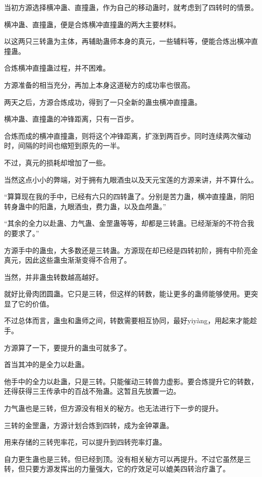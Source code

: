 
\begin{this_body}

当初方源选择横冲蛊、直撞蛊，作为自己的移动蛊时，就考虑到了四转时的情景。

横冲蛊、直撞蛊，便是合炼横冲直撞蛊的两大主要材料。

以这两只三转蛊为主体，再辅助蛊师本身的真元，一些辅料等，便能合炼出横冲直撞蛊。

合炼横冲直撞蛊过程，并不困难。

方源准备的相当充分，再加上本身这道秘方的成功率也很高。

两天之后，方源合炼成功，得到了一只全新的蛊虫横冲直撞蛊。

横冲蛊、直撞蛊的冲锋距离，只有一百步。

合炼而成的横冲直撞蛊，则将这个冲锋距离，扩涨到两百步。同时连续两次催动时，间隔的时间也缩短到原先的一半。

不过，真元的损耗却增加了一些。

当然这点小小的弊端，对于拥有九眼酒虫以及天元宝莲的方源来讲，并不算什么。

“算算现在我的手中，已经有六只的四转蛊了。分别是苦力蛊，横冲直撞蛊，阴阳转身蛊中的阳蛊，九眼酒虫，费力蛊，以及血颅蛊。”

“其余的全力以赴蛊、力气蛊、金罡蛊等等，却都是三转蛊。已经渐渐的不符合我的要求了。”

方源手中的蛊虫，大多数还是三转蛊。方源现在却已经是四转初阶，拥有中阶亮金真元，因此这些蛊虫渐渐变得不合用了。

当然，并非蛊虫转数越高越好。

就好比骨肉团圆蛊。它只是三转，但这样的转数，能让更多的蛊师能够使用。更突显了它的价值。

不过总体而言，蛊虫和蛊师之间，转数需要相互协同，最好yiyàng，用起来才能趁手。

方源算了一下，要提升的蛊虫可就多了。

首当其冲的是全力以赴蛊。

他手中的全力以赴蛊，只是三转。只能催动三转兽力虚影。要合炼提升它的转数，还得获得三王传承中的百战不殆蛊。这暂且先放置一边。

力气蛊也是三转，但方源没有相关的秘方。也无法进行下一步的提升。

三转的金罡蛊，方源计划合炼到四转，成为金钟罩蛊。

用来存储的三转兜率花，可以提升到四转兜率灯蛊。

自力更生蛊也是三转。但已经到顶。没有相关秘方可以再提升。不过它虽然是三转，但只要方源发挥出的力量强大，它的疗效足可以媲美四转治疗蛊了。


\end{this_body}
